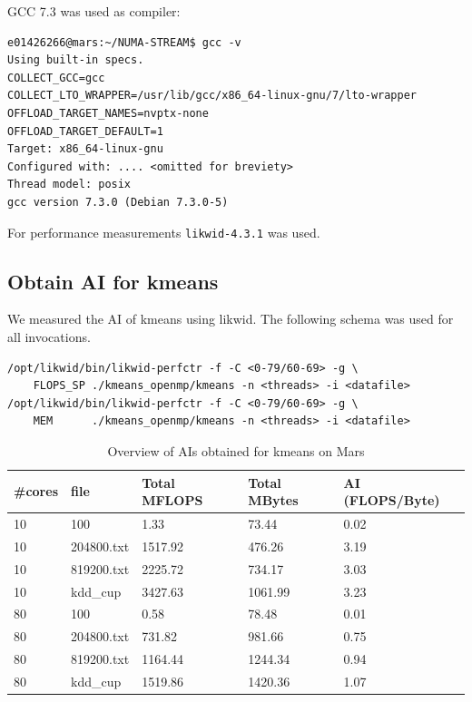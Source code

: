 \noindent GCC 7.3 was used as compiler:

\begin{verbatim}
e01426266@mars:~/NUMA-STREAM$ gcc -v
Using built-in specs.
COLLECT_GCC=gcc
COLLECT_LTO_WRAPPER=/usr/lib/gcc/x86_64-linux-gnu/7/lto-wrapper
OFFLOAD_TARGET_NAMES=nvptx-none
OFFLOAD_TARGET_DEFAULT=1
Target: x86_64-linux-gnu
Configured with: .... <omitted for breviety>
Thread model: posix
gcc version 7.3.0 (Debian 7.3.0-5)
\end{verbatim}

\noindent For performance measurements \texttt{likwid-4.3.1} was used.

\subsection{Obtain AI for kmeans}

We measured the AI of kmeans using likwid. The following schema was used for all invocations.
\begin{verbatim}
/opt/likwid/bin/likwid-perfctr -f -C <0-79/60-69> -g \
    FLOPS_SP ./kmeans_openmp/kmeans -n <threads> -i <datafile>
/opt/likwid/bin/likwid-perfctr -f -C <0-79/60-69> -g \
    MEM      ./kmeans_openmp/kmeans -n <threads> -i <datafile>
\end{verbatim}



\begin{table}[h]
\centering
\caption{\label{tab:ai_tab}Overview of AIs obtained for kmeans on Mars}
\begin{small}
\begin{tabular}{lllll}
\toprule
\#cores & file & Total MFLOPS & Total MBytes & AI (FLOPS/Byte) \\
\midrule
10 & 100 & 1.33 & 73.44 & 0.02 \\
10 & 204800.txt & 1517.92 & 476.26 & 3.19 \\
10 & 819200.txt & 2225.72 & 734.17 & 3.03 \\
10 & kdd\_cup & 3427.63 & 1061.99 & 3.23 \\
80 & 100 & 0.58 & 78.48 & 0.01 \\
80 & 204800.txt & 731.82 & 981.66 & 0.75 \\
80 & 819200.txt & 1164.44 & 1244.34 & 0.94 \\
80 & kdd\_cup & 1519.86 & 1420.36 & 1.07 \\
\bottomrule
\end{tabular}
\end{small}
\end{table}

